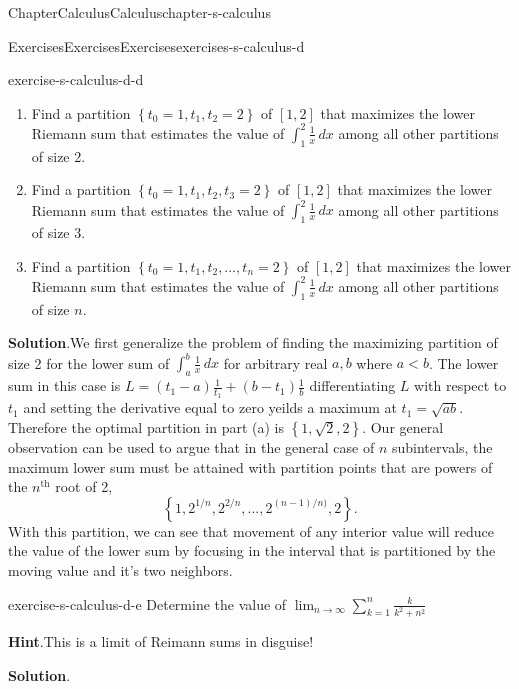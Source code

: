 \documentclass[oneside,10pt,]{book}
\newcommand{\blocktitlefont}{\relax}
\numberwithin{equation}{section}
\newcommand{\lt}{<}
\begin{document}
\begin{chapterptx}{Chapter}{Calculus}{}{Calculus}{}{}{chapter-s-calculus}
\begin{exercises-section}{Exercises}{Exercises}{}{Exercises}{}{}{exercises-s-calculus-d}
\begin{divisionexercise}{3}{}{}{exercise-s-calculus-d-d}
\begin{enumerate}[label=(\alph*)]
\item{}Find a partition \(\left\{t_0=1,t_1,t_2=2\right\}\) of \([1,2]\) that maximizes the lower Riemann sum that estimates the value of \(\int_1^2 \frac{1}{x} \, dx\) among all other partitions of size 2.%
\item{}Find a partition \(\left\{t_0=1,t_1,t_2,t_3=2\right\}\) of \([1,2]\) that maximizes the lower Riemann sum that estimates the value of \(\int_1^2 \frac{1}{x} \, dx\) among all other partitions of size 3.%
\item{}Find a partition \(\left\{t_0=1,t_1,t_2,\ldots , t_n=2\right\}\) of \([1,2]\) that maximizes the lower Riemann sum that estimates the value of \(\int_1^2 \frac{1}{x} \, dx\) among all other partitions of size \(n\).%
\end{enumerate}
%
\par\smallskip%
\noindent\textbf{\blocktitlefont Solution}.\hypertarget{solution-s-calculus-d-d-b}{}\quad{}We first generalize the problem of finding the maximizing partition of size 2 for the lower sum of \(\int_a^b \frac{1}{x} \, dx\)  for arbitrary real \(a, b\) where \(a \lt b\). The lower sum in this case is \(L=(t_1-a)\frac{1}{t_1} + (b-t_1)\frac{1}{b}\) differentiating \(L\) with respect to \(t_1\) and setting the derivative equal to zero yeilds a maximum at \(t_1=\sqrt{a b}\). Therefore the optimal partition in part (a) is \(\left\{1,\sqrt{2},2\right\}\). Our general observation can be used to argue that in the general case of \(n\) subintervals, the maximum lower sum must be attained with partition points that are powers of the \(n^{\textrm{th}}\) root of 2,%
\begin{equation*}
\left\{1,2^{1/n},2^{2/n},\dots, 2^{(n-1)/n)},2 \right\}.
\end{equation*}
With this partition, we can see that movement of any interior value will reduce the value of the lower sum by focusing in the interval that is partitioned by the moving value and it's two neighbors.%
\end{divisionexercise}%
\begin{divisionexercise}{4}{}{}{exercise-s-calculus-d-e}%
Determine the value of \(\lim _{n\to \infty }\sum _{k=1}^n \frac{k}{k^2+n^2}\)%
\par\smallskip%
\noindent\textbf{\blocktitlefont Hint}.\hypertarget{hint-s-calculus-d-e-b}{}\quad{}This is a limit of Reimann sums in disguise!%
\par\smallskip%
\noindent\textbf{\blocktitlefont Solution}.\hypertarget{solution-s-calculus-d-e-c}{}\quad{}%
\begin{equation*}

\end{equation*}
\end{divisionexercise}
\end{exercises-section}
\end{chapterptx}
\end{document}
